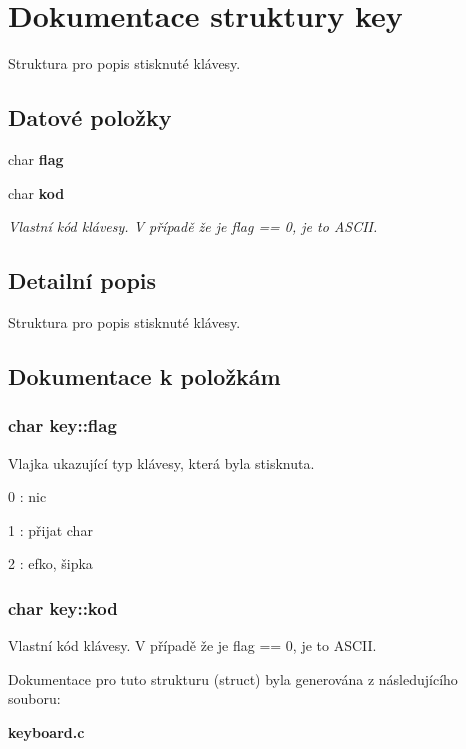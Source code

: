 \section{Dokumentace struktury key}
\label{structkey}


Struktura pro popis stisknuté klávesy.  
\subsection*{Datové položky}
\begin{DoxyCompactItemize}
\item 
char {\bf flag}
\item 
char {\bf kod}
\begin{DoxyCompactList}\small\item\em Vlastní kód klávesy. V případě že je flag == 0, je to ASCII. \item\end{DoxyCompactList}\end{DoxyCompactItemize}


\subsection{Detailní popis}
Struktura pro popis stisknuté klávesy. 

\subsection{Dokumentace k položkám}
\subsubsection[{flag}]{\setlength{\rightskip}{0pt plus 5cm}char {\bf key::flag}}\label{structkey_ae913bbd98681f233b7fb276d3b30500d}
Vlajka ukazující typ klávesy, která byla stisknuta.
\begin{DoxyItemize}
\item 0 : nic
\item 1 : přijat char
\item 2 : efko, šipka 
\end{DoxyItemize}
\subsubsection[{kod}]{\setlength{\rightskip}{0pt plus 5cm}char {\bf key::kod}}\label{structkey_a5e1fd3055f0a412982436335356bb377}


Vlastní kód klávesy. V případě že je flag == 0, je to ASCII. 

Dokumentace pro tuto strukturu (struct) byla generována z následujícího souboru:\begin{DoxyCompactItemize}
\item 
{\bf keyboard.c}\end{DoxyCompactItemize}
